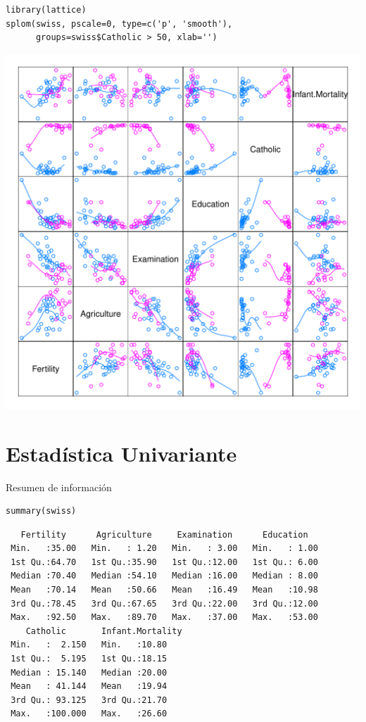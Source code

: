 \documentclass[xcolor={usenames,svgnames,dvipsnames}]{beamer}
\begin{document}
\begin{frame}[fragile,label=sec-1-3]{}
 \lstset{language=R,label= ,caption= ,numbers=none}
\begin{lstlisting}
library(lattice)
splom(swiss, pscale=0, type=c('p', 'smooth'),
      groups=swiss$Catholic > 50, xlab='')
\end{lstlisting}

\includegraphics[height=0.5\textheight]{figs/splomSwiss.pdf}
\end{frame}

\section{Estadística Univariante}
\label{sec-2}

\begin{frame}[fragile,label=sec-2-1]{Resumen de  información}
 \lstset{language=R,label= ,caption= ,numbers=none}
\begin{lstlisting}
summary(swiss)
\end{lstlisting}

\begin{verbatim}
   Fertility      Agriculture     Examination      Education    
 Min.   :35.00   Min.   : 1.20   Min.   : 3.00   Min.   : 1.00  
 1st Qu.:64.70   1st Qu.:35.90   1st Qu.:12.00   1st Qu.: 6.00  
 Median :70.40   Median :54.10   Median :16.00   Median : 8.00  
 Mean   :70.14   Mean   :50.66   Mean   :16.49   Mean   :10.98  
 3rd Qu.:78.45   3rd Qu.:67.65   3rd Qu.:22.00   3rd Qu.:12.00  
 Max.   :92.50   Max.   :89.70   Max.   :37.00   Max.   :53.00  
    Catholic       Infant.Mortality
 Min.   :  2.150   Min.   :10.80   
 1st Qu.:  5.195   1st Qu.:18.15   
 Median : 15.140   Median :20.00   
 Mean   : 41.144   Mean   :19.94   
 3rd Qu.: 93.125   3rd Qu.:21.70   
 Max.   :100.000   Max.   :26.60
\end{verbatim}
\end{frame}
\end{document}
